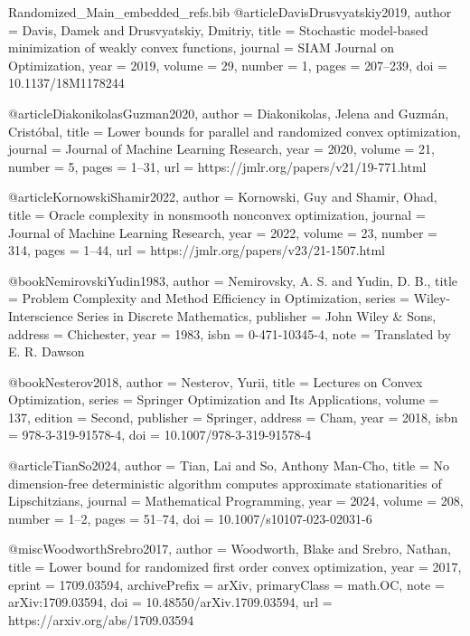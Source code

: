 \begin{filecontents*}[overwrite]{Randomized_Main_embedded_refs.bib}
@article{DavisDrusvyatskiy2019,
  author  = {Davis, Damek and Drusvyatskiy, Dmitriy},
  title   = {Stochastic model-based minimization of weakly convex functions},
  journal = {SIAM Journal on Optimization},
  year    = {2019},
  volume  = {29},
  number  = {1},
  pages   = {207--239},
  doi     = {10.1137/18M1178244}
}

@article{DiakonikolasGuzman2020,
  author  = {Diakonikolas, Jelena and Guzm{\'a}n, Crist{\'o}bal},
  title   = {Lower bounds for parallel and randomized convex optimization},
  journal = {Journal of Machine Learning Research},
  year    = {2020},
  volume  = {21},
  number  = {5},
  pages   = {1--31},
  url     = {https://jmlr.org/papers/v21/19-771.html}
}

@article{KornowskiShamir2022,
  author  = {Kornowski, Guy and Shamir, Ohad},
  title   = {Oracle complexity in nonsmooth nonconvex optimization},
  journal = {Journal of Machine Learning Research},
  year    = {2022},
  volume  = {23},
  number  = {314},
  pages   = {1--44},
  url     = {https://jmlr.org/papers/v23/21-1507.html}
}

@book{NemirovskiYudin1983,
  author    = {Nemirovsky, A. S. and Yudin, D. B.},
  title     = {Problem Complexity and Method Efficiency in Optimization},
  series    = {Wiley-Interscience Series in Discrete Mathematics},
  publisher = {John Wiley \& Sons},
  address   = {Chichester},
  year      = {1983},
  isbn      = {0-471-10345-4},
  note      = {Translated by E. R. Dawson}
}

@book{Nesterov2018,
  author    = {Nesterov, Yurii},
  title     = {Lectures on Convex Optimization},
  series    = {Springer Optimization and Its Applications},
  volume    = {137},
  edition   = {Second},
  publisher = {Springer},
  address   = {Cham},
  year      = {2018},
  isbn      = {978-3-319-91578-4},
  doi       = {10.1007/978-3-319-91578-4}
}

@article{TianSo2024,
  author  = {Tian, Lai and So, Anthony Man-Cho},
  title   = {No dimension-free deterministic algorithm computes approximate
             stationarities of {L}ipschitzians},
  journal = {Mathematical Programming},
  year    = {2024},
  volume  = {208},
  number  = {1--2},
  pages   = {51--74},
  doi     = {10.1007/s10107-023-02031-6}
}


@misc{WoodworthSrebro2017,
  author        = {Woodworth, Blake and Srebro, Nathan},
  title         = {Lower bound for randomized first order convex optimization},
  year          = {2017},
  eprint        = {1709.03594},
  archivePrefix = {arXiv},
  primaryClass  = {math.OC},
  note          = {arXiv:1709.03594},
  doi           = {10.48550/arXiv.1709.03594},
  url           = {https://arxiv.org/abs/1709.03594}
}


\end{filecontents*}
